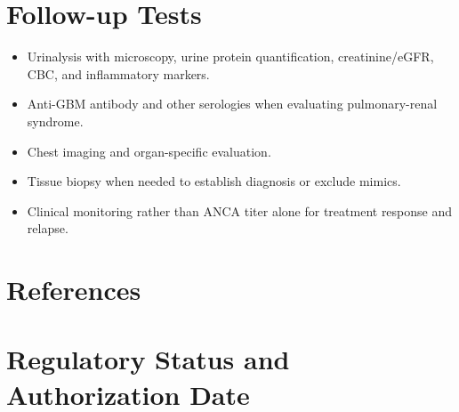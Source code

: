 \section*{Follow-up Tests}
\begin{itemize}
  \item Urinalysis with microscopy, urine protein quantification, creatinine/eGFR, CBC, and inflammatory markers.
  \item Anti-GBM antibody and other serologies when evaluating pulmonary-renal syndrome.
  \item Chest imaging and organ-specific evaluation.
  \item Tissue biopsy when needed to establish diagnosis or exclude mimics.
  \item Clinical monitoring rather than ANCA titer alone for treatment response and relapse.
\end{itemize}

\section*{References}


\clearpage
\section*{Regulatory Status and Authorization Date}

\clearpage
